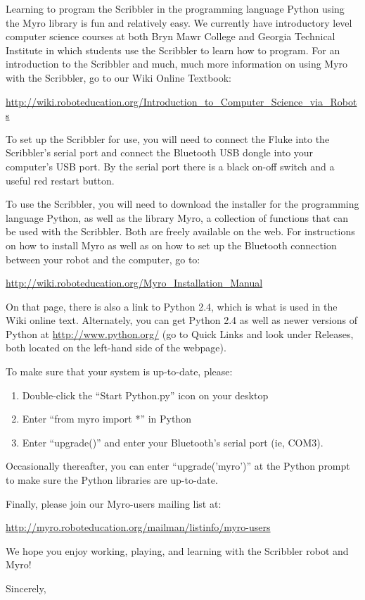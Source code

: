 \documentclass{letter}[10pt]
\begin{document}
\begin{letter}{}
Learning to program the Scribbler in the programming language Python
using the Myro library is fun and relatively easy.  We currently have
introductory level computer science courses at both Bryn Mawr College
and Georgia Technical Institute in which students use the Scribbler to
learn how to program.  For an introduction to the Scribbler and much,
much more information on using Myro with the Scribbler, go to our Wiki
Online Textbook:

\url{http://wiki.roboteducation.org/Introduction_to_Computer_Science_via_Robots}

To set up the Scribbler for use, you will need to connect the Fluke
into the Scribbler's serial port and connect the Bluetooth USB dongle
into your computer's USB port.  By the serial port there is a black
on-off switch and a useful red restart button.

To use the Scribbler, you will need to download the installer for the
programming language Python, as well as the library Myro, a collection
of functions that can be used with the Scribbler.  Both are freely
available on the web.  For instructions on how to install Myro as well
as on how to set up the Bluetooth connection between your robot and
the computer, go to:

\url{http://wiki.roboteducation.org/Myro_Installation_Manual}

On that page, there is also a link to Python 2.4, which is what is
used in the Wiki online text.  Alternately, you can get Python 2.4 as
well as newer versions of Python at \url{http://www.python.org/} (go to
Quick Links and look under Releases, both located on the left-hand
side of the webpage).

To make sure that your system is up-to-date, please:

\begin{enumerate}
\item Double-click the ``Start Python.py'' icon on your desktop
\item  Enter ``from myro import *'' in Python
\item Enter ``upgrade()'' and enter your Bluetooth's serial port (ie, COM3).
\end{enumerate}

Occasionally thereafter, you can enter ``upgrade('myro')'' at the Python
prompt to make sure the Python libraries are up-to-date.

Finally, please join our Myro-users mailing list at:

\url{http://myro.roboteducation.org/mailman/listinfo/myro-users}

We hope you enjoy working, playing, and learning with the Scribbler
robot and Myro!


\closing{Sincerely,}

\end{letter}
\end{document}
